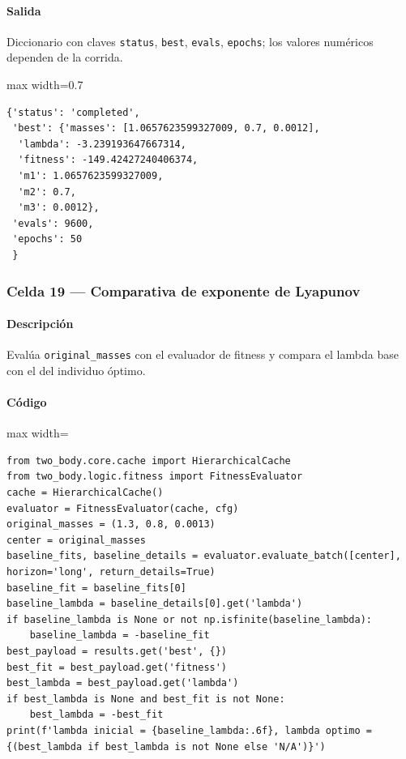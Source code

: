 \paragraph{Salida} Diccionario con claves \texttt{status}, \texttt{best}, \texttt{evals}, \texttt{epochs}; los valores numéricos dependen de la corrida.

\begin{listing}[H]
\caption{Ejemplo Salida}
\begin{adjustbox}{max width=0.7\textwidth}
\begin{minipage}{\textwidth}
\begin{verbatim}
{'status': 'completed',
 'best': {'masses': [1.0657623599327009, 0.7, 0.0012],
  'lambda': -3.239193647667314,
  'fitness': -149.42427240406374,
  'm1': 1.0657623599327009,
  'm2': 0.7,
  'm3': 0.0012},
 'evals': 9600,
 'epochs': 50
 }
\end{verbatim}
\end{minipage}
\end{adjustbox}
\end{listing}

\subsubsection*{Celda 19 — Comparativa de exponente de Lyapunov}
\paragraph{Descripción} Evalúa \texttt{original\_masses} con el evaluador de fitness y compara el lambda base con el del individuo óptimo.
\paragraph{Código}
\begin{listing}[H]
\caption{Celda 19: comparación de $\lambda$ inicial vs optimizado}
\begin{adjustbox}{max width=\textwidth}
\begin{minipage}{\textwidth}
\begin{verbatim}
from two_body.core.cache import HierarchicalCache
from two_body.logic.fitness import FitnessEvaluator
cache = HierarchicalCache()
evaluator = FitnessEvaluator(cache, cfg)
original_masses = (1.3, 0.8, 0.0013)
center = original_masses
baseline_fits, baseline_details = evaluator.evaluate_batch([center], horizon='long', return_details=True)
baseline_fit = baseline_fits[0]
baseline_lambda = baseline_details[0].get('lambda')
if baseline_lambda is None or not np.isfinite(baseline_lambda):
    baseline_lambda = -baseline_fit
best_payload = results.get('best', {})
best_fit = best_payload.get('fitness')
best_lambda = best_payload.get('lambda')
if best_lambda is None and best_fit is not None:
    best_lambda = -best_fit
print(f'lambda inicial = {baseline_lambda:.6f}, lambda optimo = {(best_lambda if best_lambda is not None else 'N/A')}')
\end{verbatim}
\end{minipage}
\end{adjustbox}
\end{listing}
